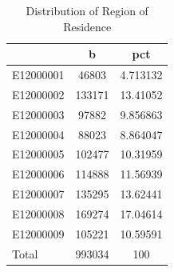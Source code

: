 \begin{table}[htbp]\centering
\def\sym#1{\ifmmode^{#1}\else\(^{#1}\)\fi}
\caption{Distribution of Region of Residence}
\begin{tabular}{l*{1}{cc}}
\hline\hline
                    &           b&         pct\\
\hline
E12000001           &       46803&    4.713132\\
E12000002           &      133171&    13.41052\\
E12000003           &       97882&    9.856863\\
E12000004           &       88023&    8.864047\\
E12000005           &      102477&    10.31959\\
E12000006           &      114888&    11.56939\\
E12000007           &      135295&    13.62441\\
E12000008           &      169274&    17.04614\\
E12000009           &      105221&    10.59591\\
Total               &      993034&         100\\
\hline\hline
\end{tabular}
\end{table}
